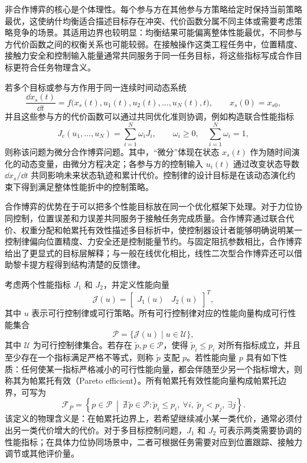 非合作博弈的核心是个体理性。每个参与方在其他参与方策略给定时保持当前策略最优，这使纳什均衡适合描述目标存在冲突、代价函数分属不同主体或需要考虑策略竞争的场景。其适用边界也较明显：均衡结果可能偏离整体性能最优，不同参与方代价函数之间的权衡关系也可能较弱。在接触操作这类工程任务中，位置精度、接触力安全和控制输入能量通常共同服务于同一任务目标，将这些指标写成合作目标更符合任务物理含义。

\begin{definition}[微分合作博弈]
\label{def:ch2_cooperative_game}
若多个目标或参与方作用于同一连续时间动态系统
\[
  \frac{\dd x_s(t)}{\dd t}
  =f\bigl(x_s(t),u_1(t),u_2(t),\ldots,u_N(t),t\bigr),
  \qquad x_s(0)=x_{s0},
\]
并且这些参与方的代价函数可以通过共同优化准则协调，例如构造联合性能指标
\[
  J_c(u_1,\ldots,u_N)=\sum_{i=1}^{N}\omega_iJ_i,
  \qquad \omega_i\ge0,\quad \sum_{i=1}^{N}\omega_i=1,
\]
则称该问题为微分合作博弈问题。其中，``微分''体现在状态 $x_s(t)$ 作为随时间演化的动态变量，由微分方程决定；各参与方的控制输入 $u_i(t)$ 通过改变状态导数 $\dd x_s/\dd t$ 共同影响未来状态轨迹和累计代价。控制律的设计目标是在该动态演化约束下得到满足整体性能折中的控制策略。
\end{definition}

合作博弈的优势在于可以把多个性能目标放在同一个优化框架下处理。对于力位协同控制，位置误差和力误差共同服务于接触任务完成质量。合作博弈通过联合代价、权重分配和帕累托有效性描述多目标折中，使控制器设计者能够明确说明某一控制律偏向位置精度、力安全还是控制能量节约。与固定阻抗参数相比，合作博弈给出了更显式的目标层解释；与一般在线优化相比，线性二次型合作博弈还可以借助黎卡提方程得到结构清楚的反馈律。

考虑两个性能指标 $J_1$ 和 $J_2$，并定义性能向量
\begin{equation}
  \mathcal J(u)=
  \begin{bmatrix}
    J_1(u) & J_2(u)
  \end{bmatrix}^T ,
  \label{eq:ch2_performance_vector}
\end{equation}
其中 $u$ 表示可行控制律或可行策略。所有可行控制律对应的性能向量构成可行性能集合
\begin{equation}
  \mathcal P=\{\mathcal J(u)\mid u\in\mathcal U\},
  \label{eq:ch2_performance_set}
\end{equation}
其中 $\mathcal U$ 为可行控制律集合。若存在 $\tilde p,p\in\mathcal P$，使得 $\tilde p_i\le p_i$ 对所有指标成立，并且至少存在一个指标满足严格不等式，则称 $\tilde p$ 支配 $p$。若性能向量 $p$ 具有如下性质：任何使某一指标严格减小的可行性能向量，都会伴随至少另一个指标增大，则称其为帕累托有效（Pareto efficient）。所有帕累托有效性能向量构成帕累托边界，可写为
\begin{equation}
  \mathcal F_P=
  \left\{p\in\mathcal P~\middle|~
  \nexists\,\tilde p\in\mathcal P:
  \tilde p_i\le p_i,~\forall i,\;
  \tilde p_j<p_j,~\exists j
  \right\}.
  \label{eq:ch2_pareto_front}
\end{equation}
该定义的物理含义是：在帕累托边界上，若希望继续减小某一类代价，通常必须付出另一类代价增大的代价。对于多目标控制问题，$J_1$ 和 $J_2$ 可表示两类需要协调的性能指标；在具体力位协同场景中，二者可根据任务需要对应到位置跟踪、接触力调节或其他评价量。

